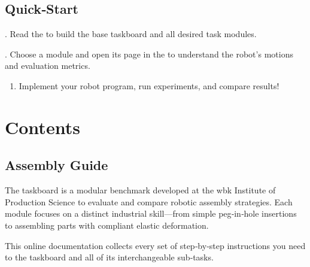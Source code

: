 \documentclass[letterpaper,10pt,english]{sphinxmanual}
\begin{document}
\section{Quick‑Start}
\label{\detokenize{index:quickstart}}
. Read the {\hyperref[\detokenize{wbk_challenge_overview::doc}]{}} to build the base taskboard and all
desired task modules.

. Choose a module and open its page in the {\hyperref[\detokenize{wbk_challenge_robot_tasks_overview::doc}]{}}
to understand the robot’s motions and evaluation metrics.
\begin{enumerate}
%
\setcounter{enumi}{2}
\item {} 
\sphinxAtStartPar
Implement your robot program, run experiments, and compare results!

\end{enumerate}


\chapter{Contents}
\label{\detokenize{index:contents}}
\sphinxstepscope


\section{Assembly Guide}
\label{\detokenize{wbk_challenge_overview:assembly-guide}}\label{\detokenize{wbk_challenge_overview::doc}}
\sphinxAtStartPar
The  taskboard is a modular benchmark developed at the wbk Institute of Production Science to evaluate and compare robotic assembly strategies.
Each module focuses on a distinct industrial skill—from simple peg‑in‑hole insertions to assembling parts with compliant elastic deformation.

\sphinxAtStartPar
This online documentation collects every set of step‑by‑step instructions you need to  the taskboard and all of its interchangeable sub‑tasks.
\end{document}
